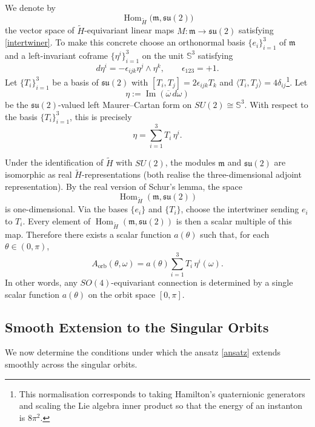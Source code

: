 \documentclass[11pt,a4paper]{article}
\numberwithin{equation}{section}
\theoremstyle{plain}
\theoremstyle{remark}
\begin{document}
\noindent
We denote by
$$
\operatorname{Hom}_{\widetilde H}
\bigl(\mathfrak m,\mathfrak{su}(2)\bigr)
$$
the vector space of $\widetilde H$-equivariant linear maps
$M:\mathfrak m\to\mathfrak{su}(2)$ satisfying
\eqref{intertwiner}. To make this concrete choose an orthonormal basis $\{e_i\}_{i=1}^3$
of $\mathfrak m$ and a left-invariant coframe $\{\eta^i\}_{i=1}^3$
on the unit $\mathbb S^3$ satisfying
\begin{equation}
d\eta^i=-\epsilon_{ijk}\eta^j\wedge\eta^k,
\qquad
\epsilon_{123}=+1.
\end{equation}
Let $\{T_i\}_{i=1}^3$ be a basis of $\mathfrak{su}(2)$ with
$[T_i,T_j]=2\epsilon_{ijk}T_k$ and
$\langle T_i,T_j\rangle=4\delta_{ij}$\footnote{This normalisation corresponds to taking Hamilton's quaternionic generators and scaling the Lie algebra inner product so that the energy of an instanton is $8\pi^2$.}. Let
$$
\eta:=\operatorname{Im}(\overline{\omega}\,d\omega)
$$
be the $\mathfrak{su}(2)$-valued left Maurer--Cartan form on
$SU(2)\cong\mathbb S^3$. With respect to the basis
$\{T_i\}_{i=1}^3$, this is precisely
$$
\eta=\sum_{i=1}^3T_i\,\eta^i.
$$ 

Under the identification of $\widetilde H$ with $SU(2)$, the modules
$\mathfrak m$ and $\mathfrak{su}(2)$ are isomorphic as real
$\widetilde H$-representations (both realise the
three-dimensional adjoint representation). By the real version of
Schur's lemma, the space
$$
\operatorname{Hom}_{\widetilde H}
(\mathfrak m,\mathfrak{su}(2))
$$
is one-dimensional. Via the bases $\{e_i\}$ and
$\{T_i\}$, choose the intertwiner sending
$e_i$ to $T_i$. Every element of
$\operatorname{Hom}_{\widetilde H}
(\mathfrak m,\mathfrak{su}(2))$
is then a scalar multiple of this map. Therefore there exists a scalar
function $a(\theta)$ such that, for each
$\theta\in(0,\pi)$,
\begin{equation}\label{ansatz}
A_{\mathrm{orb}}(\theta,\omega)
=
a(\theta)\sum_{i=1}^3T_i\,\eta^i(\omega).
\end{equation}
In other words, any $SO(4)$-equivariant connection is determined by a
single scalar function $a(\theta)$ on the orbit space $[0,\pi]$.

\subsection{Smooth Extension to the Singular Orbits}

We now determine the conditions under which the ansatz
\eqref{ansatz} extends smoothly across the singular orbits.
\end{document}
